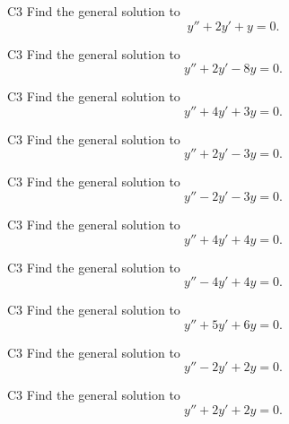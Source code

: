 \begin{problem}{C3}
Find the general solution to
\[
y'' + 2y' + y = 0.
\]
\end{problem}

\begin{problem}{C3}
Find the general solution to
\[
y'' + 2y' - 8y = 0.
\]
\end{problem}

\begin{problem}{C3}
Find the general solution to
\[
y'' + 4y' + 3y = 0.
\]
\end{problem}

\begin{problem}{C3}
Find the general solution to
\[
y'' + 2y' - 3y = 0.
\]
\end{problem}

\begin{problem}{C3}
Find the general solution to
\[
y'' - 2y' - 3y = 0.
\]
\end{problem}

\begin{problem}{C3}
Find the general solution to
\[
y'' + 4y' + 4y = 0.
\]

\end{problem}

\begin{problem}{C3}
Find the general solution to
\[
y'' - 4y' + 4y = 0.
\]
\end{problem}

\begin{problem}{C3}
Find the general solution to
\[
y'' + 5y' + 6y = 0.
\]
\end{problem}


\begin{problem}{C3}
Find the general solution to
\[
y'' - 2y' + 2y = 0.
\]
\end{problem}

\begin{problem}{C3}
Find the general solution to
\[
y'' + 2y' + 2y = 0.
\]
\end{problem}
